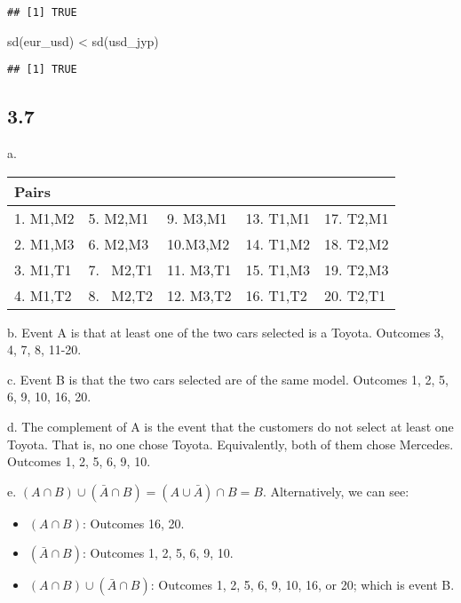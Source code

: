\documentclass[
]{article}
\newenvironment{Shaded}{\begin{snugshade}}{\end{snugshade}}
\newcommand{\FunctionTok}[1]{\textcolor[rgb]{0.00,0.00,0.00}{#1}}
\newcommand{\NormalTok}[1]{#1}
\newcommand{\SpecialCharTok}[1]{\textcolor[rgb]{0.00,0.00,0.00}{#1}}
\begin{document}
\begin{verbatim}
## [1] TRUE
\end{verbatim}

\begin{Shaded}
\begin{Highlighting}[]
\FunctionTok{sd}\NormalTok{(eur\_usd) }\SpecialCharTok{\textless{}} \FunctionTok{sd}\NormalTok{(usd\_jyp)}
\end{Highlighting}
\end{Shaded}

\begin{verbatim}
## [1] TRUE
\end{verbatim}

\hypertarget{section-4}{%
\subsection{3.7}\label{section-4}}

a.

\begin{longtable}[]{@{}lllll@{}}
\toprule
Pairs & & & & \\
\midrule
\endhead
1. M1,M2 & 5. M2,M1 & 9. M3,M1 & 13. T1,M1 & 17. T2,M1 \\
2. M1,M3 & 6. M2,M3 & 10.M3,M2 & 14. T1,M2 & 18. T2,M2 \\
3. M1,T1 & 7.~ M2,T1 & 11. M3,T1 & 15. T1,M3 & 19. T2,M3 \\
4. M1,T2 & 8.~ M2,T2 & 12. M3,T2 & 16. T1,T2 & 20. T2,T1 \\
\bottomrule
\end{longtable}

b. Event A is that at least one of the two cars selected is a Toyota.
Outcomes 3, 4, 7, 8, 11-20.

c. Event B is that the two cars selected are of the same model. Outcomes
1, 2, 5, 6, 9, 10, 16, 20.

d. The complement of A is the event that the customers do not select at
least one Toyota. That is, no one chose Toyota. Equivalently, both of
them chose Mercedes. Outcomes 1, 2, 5, 6, 9, 10.

e. \((A \cap B) \cup (\bar{A} \cap B) = (A \cup \bar{A}) \cap B = B\).
Alternatively, we can see:

\begin{itemize}
\item
  \((A \cap B)\): Outcomes 16, 20.
\item
  \((\bar{A} \cap B)\): Outcomes 1, 2, 5, 6, 9, 10.
\item
  \((A \cap B) \cup (\bar{A} \cap B)\): Outcomes 1, 2, 5, 6, 9, 10, 16,
  or 20; which is event B.
\end{itemize}
\end{document}
